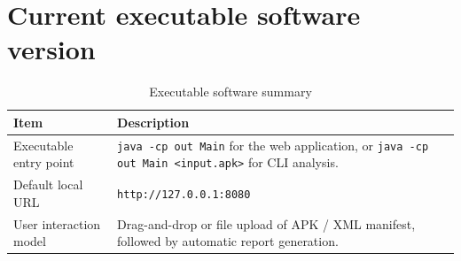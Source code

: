 \documentclass[preprint,12pt,a4paper]{elsarticle}
\begin{document}
\section*{Current executable software version}

\begin{table}[!h]
\begin{tabular}{|l|p{12cm}|}
\hline
\textbf{Item} & \textbf{Description} \\
\hline
Executable entry point & \texttt{java -cp out Main} for the web application, or \texttt{java -cp out Main <input.apk>} for CLI analysis. \\
\hline
Default local URL & \texttt{http://127.0.0.1:8080} \\
\hline
User interaction model & Drag-and-drop or file upload of APK / XML manifest, followed by automatic report generation. \\
\hline
\end{tabular}
\caption{Executable software summary}
\end{table}
\end{document}
